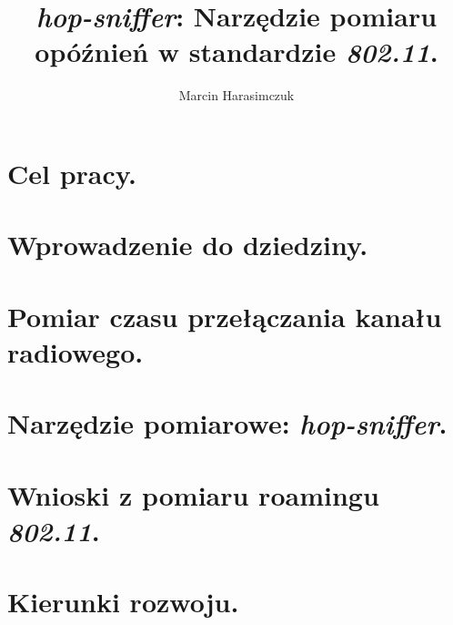 \documentclass[11pt,a4paper,oneside]{report}
\begin{document}
\title{ \emph{hop-sniffer}: Narzędzie pomiaru opóźnień w standardzie \emph{802.11}. }
\author{ Marcin Harasimczuk }
\maketitle

\tableofcontents

\newpage
\thispagestyle{empty}
\mbox{}


\section{Cel pracy.}


\section{Wprowadzenie do dziedziny.}


\section{Pomiar czasu przełączania kanału radiowego.}


\section{Narzędzie pomiarowe: \emph{hop-sniffer}.}


\section{Wnioski z pomiaru roamingu \emph{802.11}.}


\section{Kierunki rozwoju.}


\nocite{*}

\end{document}
